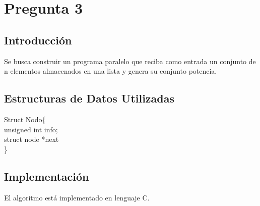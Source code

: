 \documentclass{report}
\newcommand \minitab{\hspace*{15 pt}}
\begin{document}
%
\section{Pregunta 3}
\subsection{Introducci\'on}
Se busca construir un programa paralelo que reciba como entrada un conjunto de n elementos almacenados en una lista y genera su conjunto potencia.
%

\subsection{Estructuras de Datos Utilizadas}
Struct Nodo\{\\
    \minitab unsigned int info;\\
    \minitab struct node *next\\
\}


\subsection{Implementaci\'on}
El algoritmo est\'a implementado en lenguaje C.
\end{document}
